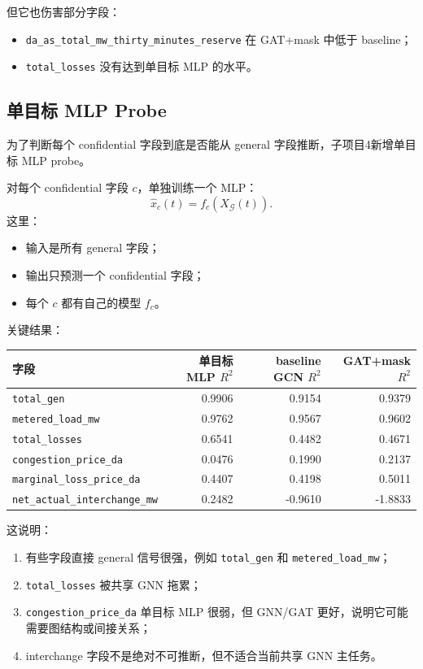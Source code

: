 \documentclass[UTF8]{ctexart}
\begin{document}
但它也伤害部分字段：
\begin{itemize}
    \item \texttt{da\_as\_total\_mw\_thirty\_minutes\_reserve} 在 GAT+mask 中低于 baseline；
    \item \texttt{total\_losses} 没有达到单目标 MLP 的水平。
\end{itemize}

\subsection{单目标 MLP Probe}

为了判断每个 confidential 字段到底是否能从 general 字段推断，子项目4新增单目标 MLP probe。

对每个 confidential 字段 \(c\)，单独训练一个 MLP：
\[
\hat{x}_c(t)
=
f_c(X_{\mathcal{G}}(t)).
\]
这里：
\begin{itemize}
    \item 输入是所有 general 字段；
    \item 输出只预测一个 confidential 字段；
    \item 每个 \(c\) 都有自己的模型 \(f_c\)。
\end{itemize}

关键结果：
\begin{center}
\begin{tabular}{lrrr}
\toprule
字段 & 单目标 MLP \(R^2\) & baseline GCN \(R^2\) & GAT+mask \(R^2\) \\
\midrule
\texttt{total\_gen} & 0.9906 & 0.9154 & 0.9379 \\
\texttt{metered\_load\_mw} & 0.9762 & 0.9567 & 0.9602 \\
\texttt{total\_losses} & 0.6541 & 0.4482 & 0.4671 \\
\texttt{congestion\_price\_da} & 0.0476 & 0.1990 & 0.2137 \\
\texttt{marginal\_loss\_price\_da} & 0.4407 & 0.4198 & 0.5011 \\
\texttt{net\_actual\_interchange\_mw} & 0.2482 & -0.9610 & -1.8833 \\
\bottomrule
\end{tabular}
\end{center}

这说明：
\begin{enumerate}
    \item 有些字段直接 general 信号很强，例如 \texttt{total\_gen} 和 \texttt{metered\_load\_mw}；
    \item \texttt{total\_losses} 被共享 GNN 拖累；
    \item \texttt{congestion\_price\_da} 单目标 MLP 很弱，但 GNN/GAT 更好，说明它可能需要图结构或间接关系；
    \item interchange 字段不是绝对不可推断，但不适合当前共享 GNN 主任务。
\end{enumerate}
\end{document}
